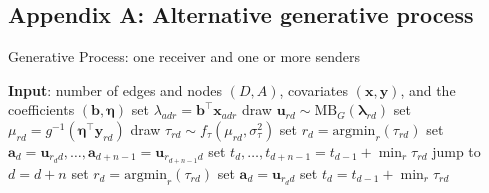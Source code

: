 \documentclass[ba]{imsart}
\numberwithin{equation}{section}
\theoremstyle{plain}
\begin{document}
	\subsection*{Appendix A: Alternative generative process} \label{appendix:alternativeGP}
	\begin{algorithm}[H]
		\SetAlgoLined
		\caption{Generative Process: one receiver and one or more senders}
		\begin{algorithmic}
			\STATE \textbf{Input}: number of edges and nodes $(D, A)$, covariates $(\boldsymbol{x}, \boldsymbol{y})$, and the coefficients $(\boldsymbol{b}, \boldsymbol{\eta})$
			\vskip 0.1in				
			\STATE	set $\lambda_{adr} = {\boldsymbol{b}}^{\top}\boldsymbol{x}_{adr}$
			\ENDFOR
			\STATE	draw $\boldsymbol{u}_{rd}  \sim
			\mbox{MB}_G(\boldsymbol{\lambda}_{rd})$
			\STATE		set $\mu_{rd} = g^{-1}(\boldsymbol{\eta}^\top \boldsymbol{y}_{rd})$
			\STATE		draw $\tau_{rd} \sim f_\tau(\mu_{rd}, \sigma_\tau^2)$
			\ENDFOR
			\STATE	set ${r}_d=\mbox{argmin}_{r}(\tau_{rd})$
			\STATE	set $\boldsymbol{a}_d=\boldsymbol{u}_{r_d d},\ldots,\boldsymbol{a}_{d+n-1}=\boldsymbol{u}_{r_{d+n-1} d}$
			\STATE	set $t_d, \ldots, t_{d+n-1}=t_{d-1} + \min_r\tau_{rd}$
			\STATE		jump to $d = d+n$
			\ELSE
			\STATE	set ${r}_d = \mbox{argmin}_{r}(\tau_{rd}) $
			\STATE	set $\boldsymbol{a}_d= \boldsymbol{u}_{r_d d}$
			\STATE	set $t_d =t_{d-1} + \min_r\tau_{rd}$
			\ENDIF
			\ENDFOR
		\end{algorithmic}
		\label{alg:generative2}
	\end{algorithm}
\end{document}
